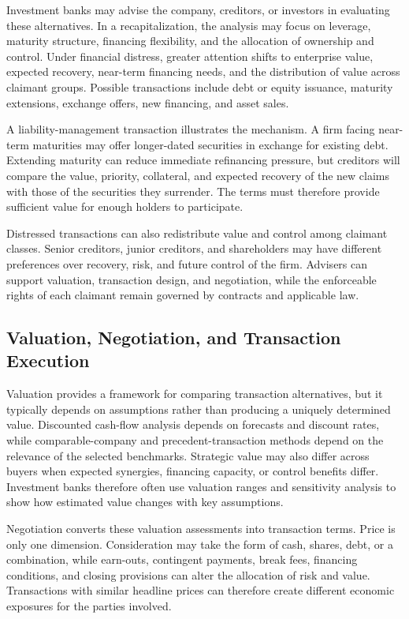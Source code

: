 Investment banks may advise the company, creditors, or investors in evaluating these alternatives. In a recapitalization, the analysis may focus on leverage, maturity structure, financing flexibility, and the allocation of ownership and control. Under financial distress, greater attention shifts to enterprise value, expected recovery, near-term financing needs, and the distribution of value across claimant groups. Possible transactions include debt or equity issuance, maturity extensions, exchange offers, new financing, and asset sales.

A liability-management transaction illustrates the mechanism. A firm facing near-term maturities may offer longer-dated securities in exchange for existing debt. Extending maturity can reduce immediate refinancing pressure, but creditors will compare the value, priority, collateral, and expected recovery of the new claims with those of the securities they surrender. The terms must therefore provide sufficient value for enough holders to participate.

Distressed transactions can also redistribute value and control among claimant classes. Senior creditors, junior creditors, and shareholders may have different preferences over recovery, risk, and future control of the firm. Advisers can support valuation, transaction design, and negotiation, while the enforceable rights of each claimant remain governed by contracts and applicable law.

\subsection{Valuation, Negotiation, and Transaction Execution}

Valuation provides a framework for comparing transaction alternatives, but it typically depends on assumptions rather than producing a uniquely determined value. Discounted cash-flow analysis depends on forecasts and discount rates, while comparable-company and precedent-transaction methods depend on the relevance of the selected benchmarks. Strategic value may also differ across buyers when expected synergies, financing capacity, or control benefits differ. Investment banks therefore often use valuation ranges and sensitivity analysis to show how estimated value changes with key assumptions.

Negotiation converts these valuation assessments into transaction terms. Price is only one dimension. Consideration may take the form of cash, shares, debt, or a combination, while earn-outs, contingent payments, break fees, financing conditions, and closing provisions can alter the allocation of risk and value. Transactions with similar headline prices can therefore create different economic exposures for the parties involved.

